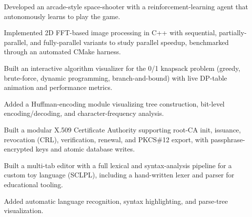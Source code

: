 \documentclass[a4paper,10pt]{article}
\begin{document}
\begin{cvitems}
  \item Developed an arcade-style space-shooter with a reinforcement-learning
        agent that autonomously learns to play the game.
\end{cvitems}


\begin{cvitems}
  \item Implemented 2D FFT-based image processing in C++ with sequential,
        partially-parallel, and fully-parallel variants to study parallel
        speedup, benchmarked through an automated CMake harness.
\end{cvitems}

\begin{cvitems}
  \item Built an interactive algorithm visualizer for the 0/1 knapsack problem
        (greedy, brute-force, dynamic programming, branch-and-bound) with live
        DP-table animation and performance metrics.
  \item Added a Huffman-encoding module visualizing tree construction, bit-level
        encoding/decoding, and character-frequency analysis.
\end{cvitems}

\begin{cvitems}
  \item Built a modular X.509 Certificate Authority supporting root-CA init,
        issuance, revocation (CRL), verification, renewal, and PKCS\#12 export,
        with passphrase-encrypted keys and atomic database writes.
\end{cvitems}

\begin{cvitems}
  \item Built a multi-tab editor with a full lexical and syntax-analysis pipeline
        for a custom toy language (SCLPL), including a hand-written lexer and
        parser for educational tooling.
  \item Added automatic language recognition, syntax highlighting, and parse-tree
        visualization.
\end{cvitems}
\end{document}
